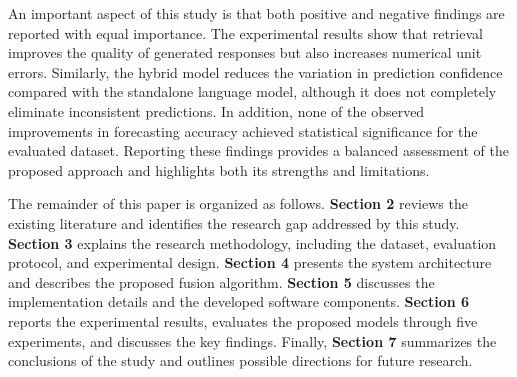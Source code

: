 An important aspect of this study is that both positive and negative
findings are reported with equal importance. The experimental results
show that retrieval improves the quality of generated responses but also
increases numerical unit errors. Similarly, the hybrid model reduces the
variation in prediction confidence compared with the standalone language
model, although it does not completely eliminate inconsistent
predictions. In addition, none of the observed improvements in
forecasting accuracy achieved statistical significance for the evaluated
dataset. Reporting these findings provides a balanced assessment of the
proposed approach and highlights both its strengths and limitations.

The remainder of this paper is organized as follows. \textbf{Section 2}
reviews the existing literature and identifies the research gap
addressed by this study. \textbf{Section 3} explains the research
methodology, including the dataset, evaluation protocol, and
experimental design. \textbf{Section 4} presents the system architecture
and describes the proposed fusion algorithm. \textbf{Section 5}
discusses the implementation details and the developed software
components. \textbf{Section 6} reports the experimental results,
evaluates the proposed models through five experiments, and discusses
the key findings. Finally, \textbf{Section 7} summarizes the conclusions
of the study and outlines possible directions for future research.
